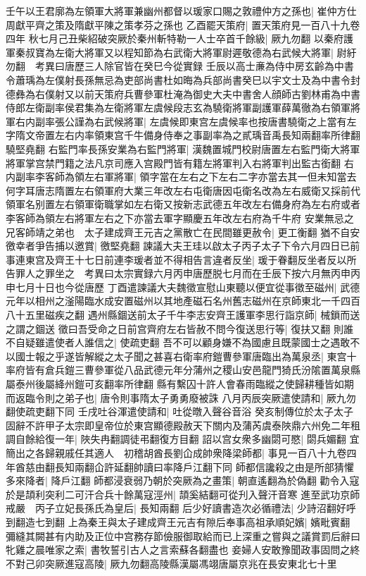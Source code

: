 壬午以王君廓為左領軍大將軍兼幽州都督以瑗家口賜之敦禮仲方之孫也|{
	崔仲方仕周獻平齊之策及隋獻平陳之策孝芬之孫也}
乙酉罷天策府|{
	置天策府見一百八十九卷四年}
秋七月己丑柴紹破突厥於秦州斬特勒一人士卒首千餘級|{
	厥九勿翻}
以秦府護軍秦叔寶為左衛大將軍又以程知節為右武衛大將軍尉遲敬德為右武候大將軍|{
	尉紆勿翻　考異曰唐歷三人除官皆在癸巳今從實録}
壬辰以高士亷為侍中房玄齡為中書令蕭瑀為左僕射長孫無忌為吏部尚書杜如晦為兵部尚書癸巳以宇文士及為中書令封德彝為右僕射又以前天策府兵曹參軍杜淹為御史大夫中書舍人顔師古劉林甫為中書侍郎左衛副率侯君集為左衛將軍左虞候段志玄為驍衛將軍副護軍薛萬徹為右領軍將軍右内副率張公謹為右武候將軍|{
	左虞候即東宫左虞候率也按唐書驍衛之上當有左字隋文帝置左右内率領東宫千牛備身侍奉之事副率為之貳瑀音禹長知兩翻率所律翻驍堅堯翻}
右監門率長孫安業為右監門將軍|{
	漢魏置城門校尉唐置左右監門衛大將軍將軍掌宫禁門籍之法凡京司應入宫殿門皆有籍左將軍判入右將軍判出監古銜翻}
右内副率李客師為領左右軍將軍|{
	領字當在左右之下左右二字亦當去其一但未知當去何字耳唐志隋置左右領軍府大業三年改左右屯衛唐因屯衛名改為左右威衛又採前代領軍名别置左右領軍衛職掌如左右衛又按新志武德五年改左右備身府為左右府或者李客師為領左右將軍左右之下亦當去軍字顯慶五年改左右府為千牛府}
安業無忌之兄客師靖之弟也　太子建成齊王元吉之黨散亡在民間雖更赦令|{
	更工衡翻}
猶不自安徼幸者爭告捕以邀賞|{
	徼堅堯翻}
諫議大夫王珪以啟太子丙子太子下令六月四日已前事連東宫及齊王十七日前連李瑗者並不得相告言違者反坐|{
	瑗于眷翻反坐者反以所告罪人之罪坐之　考異曰太宗實録六月丙申唐歷脱七月而在壬辰下按六月無丙申丙申七月十日也今從唐歷}
丁酉遣諫議大夫魏徵宣慰山東聽以便宜從事徵至磁州|{
	武德元年以相州之滏陽臨水成安置磁州以其地產磁石名州舊志磁州在京師東北一千四百八十五里磁疾之翻}
遇州縣錮送前太子千牛李志安齊王護軍李思行詣京師|{
	械鎖而送之謂之錮送}
徵曰吾受命之日前宫齊府左右皆赦不問今復送思行等|{
	復扶又翻}
則誰不自疑雖遣使者人誰信之|{
	使疏吏翻}
吾不可以顧身嫌不為國慮且既蒙國士之遇敢不以國士報之乎遂皆解縱之太子聞之甚喜右衛率府鎧曹參軍唐臨出為萬泉丞|{
	東宫十率府皆有倉兵鎧三曹參軍從八品武德元年分蒲州之稷山安邑龍門猗氏汾隂置萬泉縣屬泰州後屬絳州鎧可亥翻率所律翻}
縣有繫囚十許人會春雨臨縱之使歸耕種皆如期而返臨令則之弟子也|{
	唐令則事隋太子勇勇廢被誅}
八月丙辰突厥遣使請和|{
	厥九勿翻使疏吏翻下同}
壬戌吐谷渾遣使請和|{
	吐從暾入聲谷音浴}
癸亥制傳位於太子太子固辭不許甲子太宗即皇帝位於東宫顯德殿赦天下關内及蒲芮虞泰陜鼎六州免二年租調自餘給復一年|{
	陜失冉翻調徒弔翻復方目翻}
詔以宫女衆多幽閟可愍|{
	閟兵媚翻}
宜簡出之各歸親戚任其適人　初稽胡酋長劉仚成帥衆降梁師都|{
	事見一百八十九卷四年酋慈由翻長知兩翻仚許延翻帥讀曰率降戶江翻下同}
師都信讒殺之由是所部猜懼多來降者|{
	降戶江翻}
師都浸衰弱乃朝於突厥為之畫策|{
	朝直遙翻為於偽翻}
勸令入寇於是頡利突利二可汗合兵十餘萬寇涇州|{
	頡奚結翻可從刋入聲汗音寒}
進至武功京師戒嚴　丙子立妃長孫氏為皇后|{
	長知兩翻}
后少好讀書造次必循禮法|{
	少詩沼翻好呼到翻造七到翻}
上為秦王與太子建成齊王元吉有隙后奉事高祖承順妃嬪|{
	嬪毗賓翻}
彌縫其闕甚有内助及正位中宫務存節儉服御取給而已上深重之嘗與之議賞罰后辭曰牝雞之晨唯家之索|{
	書牧誓引古人之言索蘇各翻盡也}
妾婦人安敢豫聞政事固問之終不對己卯突厥進寇高陵|{
	厥九勿翻高陵縣漢屬馮翊唐屬京兆在長安東北七十里}


